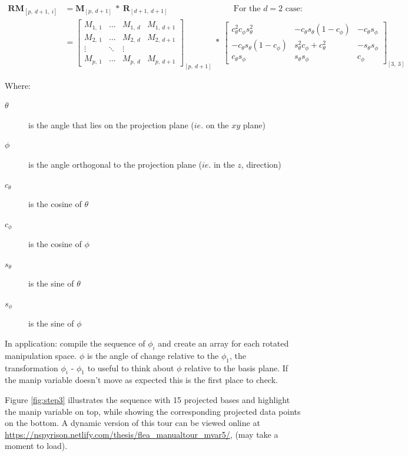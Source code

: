 \documentclass{monashthesis}
\begin{document}
\begin{align*}
  \textbf{RM}_{[p,~d+1,~i]}
  &= \textbf{M}_{[p,~d+1]} ~*~ \textbf{R}_{[d+1,~d+1]}
    ~~~~~~~~~~~~~~~~~~~~~~~~~~~~~~~~~~~~\text{For the $d=2$ case:} \\
  &= \begin{bmatrix}
    M_{1,~1} & \dots & M_{1,~d} & M_{1,~d+1} \\
    M_{2,~1} & \dots & M_{2,~d} & M_{2,~d+1} \\
    \vdots   & \ddots& \vdots   \\
    M_{p,~1} & \dots & M_{p,~d} & M_{p,~d+1}
  \end{bmatrix}_{[p,~d+1]}
    ~*~
  \begin{bmatrix}
    c_\theta^2 c_\phi s_\theta^2 &
    -c_\theta s_\theta (1 - c_\phi) &
    -c_\theta s_\phi \\
    -c_\theta s_\theta (1 - c_\phi) &
    s_\theta^2 c_\phi + c_\theta^2 &
    -s_\theta s_\phi \\
    c_\theta s_\phi &
    s_\theta s_\phi &
    c_\phi
  \end{bmatrix}_{[3,~3]}
\end{align*}

Where:

\begin{description}
  \item[$\theta$] is the angle that lies on the projection plane ($ie.$ on the $xy$ plane)
  \item[$\phi$] is the angle orthogonal to the projection plane ($ie.$ in the $z$, direction)
  \item[$c_\theta$] is the cosine of $\theta$
  \item[$c_\phi$]   is the cosine of $\phi$
  \item[$s_\theta$] is the sine of   $\theta$
  \item[$s_\phi$]   is the sine of   $\phi$
\end{description}

In application: compile the sequence of \(\phi_i\) and create an array
for each rotated manipulation space. \(\phi\) is the angle of change
relative to the \(\phi_1\), the transformation \(\phi_i\) - \(\phi_1\)
to useful to think about \(\phi\) relative to the basis plane. If the
manip variable doesn't move as expected this is the first place to
check.

Figure \ref{fig:step3} illustrates the sequence with 15 projected bases
and highlight the manip variable on top, while showing the corresponding
projected data points on the bottom. A dynamic version of this tour can
be viewed online at
\url{https://nspyrison.netlify.com/thesis/flea_manualtour_mvar5/}, (may
take a moment to load).
\end{document}
